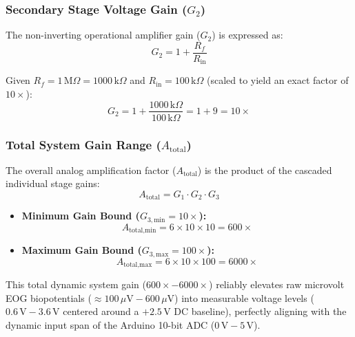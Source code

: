 \FloatBarrier
\subsubsection{\texorpdfstring{Secondary Stage Voltage Gain ($G_2$)}{Secondary Stage Voltage Gain (G2)}}
\label{subsubsec:secondary_gain_calc}

The non-inverting operational amplifier gain ($G_2$) is expressed as:
\begin{equation}
G_2 = 1 + \frac{R_f}{R_{\text{in}}}
\label{eq:g2_formula}
\end{equation}

Given $R_f = 1\,\text{M}\Omega = 1000\,\text{k}\Omega$ and $R_{\text{in}} = 100\,\text{k}\Omega$ (scaled to yield an exact factor of $10\times$):
\begin{equation}
G_2 = 1 + \frac{1000\,\text{k}\Omega}{100\,\text{k}\Omega} = 1 + 9 = 10\times
\label{eq:g2_result}
\end{equation}

\FloatBarrier
\subsubsection{\texorpdfstring{Total System Gain Range ($A_{\text{total}}$)}{Total System Gain Range (Atotal)}}
\label{subsubsec:total_gain_calc}

The overall analog amplification factor ($A_{\text{total}}$) is the product of the cascaded individual stage gains:
\begin{equation}
A_{\text{total}} = G_1 \cdot G_2 \cdot G_3
\label{eq:atotal_formula}
\end{equation}

\begin{itemize}
    \item \textbf{Minimum Gain Bound ($G_{3,\text{min}} = 10\times$):}
    \begin{equation}
    A_{\text{total,min}} = 6 \times 10 \times 10 = 600\times
    \label{eq:atotal_min}
    \end{equation}
    \item \textbf{Maximum Gain Bound ($G_{3,\text{max}} = 100\times$):}
    \begin{equation}
    A_{\text{total,max}} = 6 \times 10 \times 100 = 6000\times
    \label{eq:atotal_max}
    \end{equation}
\end{itemize}

\begin{tcolorbox}[colback=blue!5!white,colframe=blue!75!black,title=\textbf{Biomedical Signal Conditioning Summary}]
This total dynamic system gain ($600\times - 6000\times$) reliably elevates raw microvolt EOG biopotentials ($\approx 100\,\mu\text{V} - 600\,\mu\text{V}$) into measurable voltage levels ($0.6\,\text{V} - 3.6\,\text{V}$ centered around a $+2.5\,\text{V}$ DC baseline), perfectly aligning with the dynamic input span of the Arduino 10-bit ADC ($0\,\text{V} - 5\,\text{V}$).
\end{tcolorbox}
